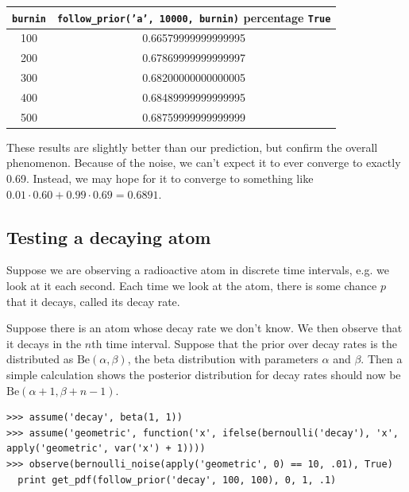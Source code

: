 \documentclass[11pt]{article}
\begin{document}
\begin{center}
\begin{tabular}{|c | c|} \hline
{\tt burnin} & {\tt follow\_prior('a', 10000, burnin)} percentage {\tt True}  \\ \hline
100 &  0.66579999999999995 \\ \hline
200 &  0.67869999999999997 \\ \hline
300 &  0.68200000000000005 \\ \hline
400 &  0.68489999999999995 \\ \hline
500 &  0.68759999999999999 \\ \hline
\end{tabular}
\end{center}

These results are slightly better than our prediction, but confirm the overall phenomenon.  Because of the noise, we can't expect it to ever converge to exactly 0.69.  Instead, we may hope for it to converge to something like $0.01 \cdot 0.60 + 0.99 \cdot 0.69 = 0.6891$.  


\subsection{Testing a decaying atom}

Suppose we are observing a radioactive atom in discrete time intervals, e.g. we look at it each second.  Each time we look at the atom, there is some chance $p$ that it decays, called its decay rate.  

Suppose there is an atom whose decay rate we don't know.  We then observe that it decays in the $n$th time interval.  Suppose that the prior over decay rates is the distributed as $\text{Be}(\alpha, \beta)$, the beta distribution with parameters $\alpha$ and $\beta$.  Then a simple calculation shows the posterior distribution for decay rates should now be $\text{Be}(\alpha + 1, \beta + n - 1)$. 

\begin{small}
\begin{verbatim}
>>> assume('decay', beta(1, 1)) 
>>> assume('geometric', function('x', ifelse(bernoulli('decay'), 'x', apply('geometric', var('x') + 1))))
>>> observe(bernoulli_noise(apply('geometric', 0) == 10, .01), True)
  print get_pdf(follow_prior('decay', 100, 100), 0, 1, .1) 
\end{verbatim}
\end{small}

\end{document}
